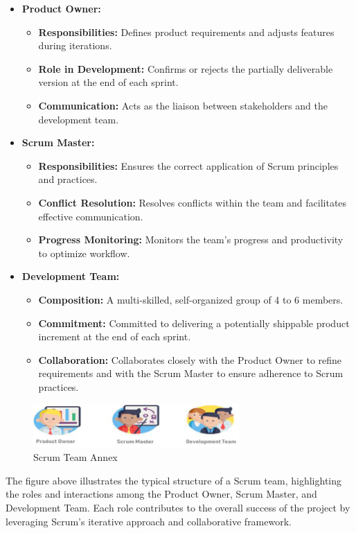 \begin{itemize}
\item \textbf{Product Owner:}
  \begin{itemize}
  \item \textbf{Responsibilities:} Defines product requirements and adjusts features during iterations.
  \item \textbf{Role in Development:} Confirms or rejects the partially deliverable version at the end of each sprint.
  \item \textbf{Communication:} Acts as the liaison between stakeholders and the development team.
  \end{itemize}
  
\item \textbf{Scrum Master:}
  \begin{itemize}
  \item \textbf{Responsibilities:} Ensures the correct application of Scrum principles and practices.
  \item \textbf{Conflict Resolution:} Resolves conflicts within the team and facilitates effective communication.
  \item \textbf{Progress Monitoring:} Monitors the team's progress and productivity to optimize workflow.
  \end{itemize}
  
\item \textbf{Development Team:}
  \begin{itemize}
  \item \textbf{Composition:} A multi-skilled, self-organized group of 4 to 6 members.
  \item \textbf{Commitment:} Committed to delivering a potentially shippable product increment at the end of each sprint.
  \item \textbf{Collaboration:} Collaborates closely with the Product Owner to refine requirements and with the Scrum Master to ensure adherence to Scrum practices.
  \end{itemize}
\end{itemize}

\begin{figure}[h]
\centering
\includegraphics[width=0.7\textwidth]{media/scrum_annex.png}
\caption{Scrum Team Annex}
\label{fig:scrum_team}
\end{figure}

The figure above illustrates the typical structure of a Scrum team, highlighting the roles and interactions among the Product Owner, Scrum Master, and Development Team. Each role contributes to the overall success of the project by leveraging Scrum's iterative approach and collaborative framework.
\thispagestyle{empty} 